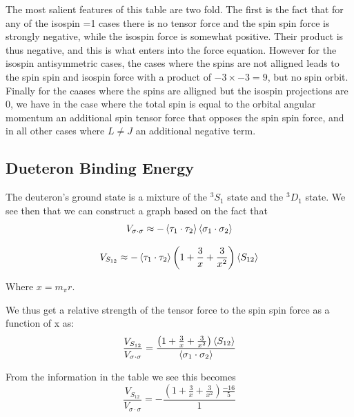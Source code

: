 \documentclass[11pt]{article} %
\begin{document}
The most salient features of this table are two fold. The first is the fact that for any of the isospin =1 cases there is no tensor force and the spin spin force is strongly negative, while the isospin force is somewhat positive. Their product is thus negative, and this is what enters into the force equation. However for the isospin antisymmetric cases, the cases where the spins are not alligned leads to the spin spin and isospin force with a product of $-3 \times -3=9$, but no spin orbit. Finally for the caases where the spins are alligned but the isospin projections are 0, we have in the case where the total spin is equal to the orbital angular momentum an additional spin tensor force that opposes the spin spin force, and in all other cases where $L\neq J$ an additional negative term. \\

\subsection{Dueteron Binding Energy}

The deuteron's ground state is a mixture of the $^{3}S_1$ state  and the $^{3}D_1$ state. We see then that we can construct a graph based on the fact that\\

\begin{equation}
V_{\sigma \cdot \sigma}\approx - \braket{\tau_1 \cdot \tau_2} \braket{\sigma_1 \cdot \sigma_2}\end{equation}

\begin{equation}
V_{S_{12}}\approx -\braket{\tau_1 \cdot \tau_2} \left(1+\frac{3}{x}+\frac{3}{x^2}\right) \braket{S_{12}}
\end{equation}

Where $x=m_\pi r$.

We thus get a relative strength of the tensor force to the spin spin force as a function of x as:\\

\begin{equation}
\frac{V_{S_{12}}}{V_{\sigma \cdot \sigma}}=\frac{\left(1+\frac{3}{x}+\frac{3}{x^2}\right) \braket{S_{12}}}{\braket{\sigma_1 \cdot \sigma_2}}\end{equation}

From the information in the table we see this becomes\\

\begin{equation}
\frac{V_{S_{12}}}{V_{\sigma \cdot \sigma}}=-\frac{\left(1+\frac{3}{x}+\frac{3}{x^2}\right)\frac{-16}{5}}{1}\end{equation}
\end{document}
